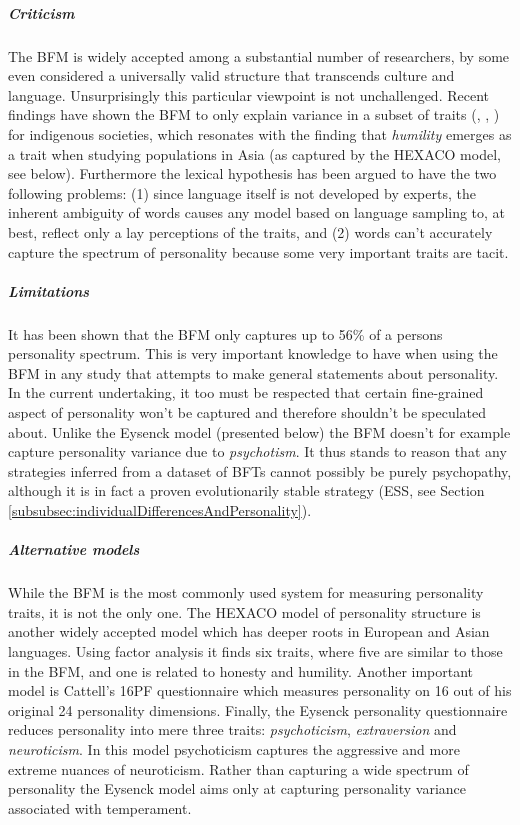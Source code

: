 \subparagraph*{Criticism} The BFM is widely accepted among a substantial number of researchers, by some even considered a universally valid structure that transcends culture and language. Unsurprisingly this particular viewpoint is not unchallenged. Recent findings have shown the BFM to only explain variance in a subset of traits (\CON, \EXT, \NEU) for indigenous societies, which resonates with the finding that \textit{humility} emerges as a trait when studying populations in Asia (as captured by the HEXACO model, see below). Furthermore the lexical hypothesis has been argued to have the two following problems: (1) since language itself is not developed by experts, the inherent ambiguity of words causes any model based on language sampling to, at best, reflect only a lay perceptions of the traits, and (2) words can't accurately capture the spectrum of personality because some very important traits are tacit.

\subparagraph*{Limitations} It has been shown that the BFM only captures up to 56\% of a persons personality spectrum. This is very important knowledge to have when using the BFM in any study that attempts to make general statements about personality. In the current undertaking, it too must be respected that certain fine-grained aspect of personality won't be captured and therefore shouldn't be speculated about. Unlike the Eysenck model (presented below) the BFM doesn't for example capture personality variance due to \textit{psychotism}. It thus stands to reason that any strategies inferred from a dataset of BFTs cannot possibly be purely psychopathy, although it is in fact a proven evolutionarily stable strategy (ESS, see Section \ref{subsubsec:individualDifferencesAndPersonality}).

\subparagraph*{Alternative models} While the BFM is the most commonly used system for measuring personality traits, it is not the only one. The HEXACO model of personality structure is another widely accepted model which has deeper roots in European and Asian languages. Using factor analysis it finds six traits, where five are similar to those in the BFM, and one is related to honesty and humility. Another important model is Cattell's 16PF questionnaire which measures personality on 16 out of his original 24 personality dimensions. Finally, the Eysenck personality questionnaire reduces personality into mere three traits: \textit{psychoticism},	\textit{extraversion} and \textit{neuroticism}. In this model psychoticism captures the aggressive and more extreme nuances of neuroticism. Rather than capturing a wide spectrum of personality the Eysenck model aims only at capturing personality variance associated with temperament.